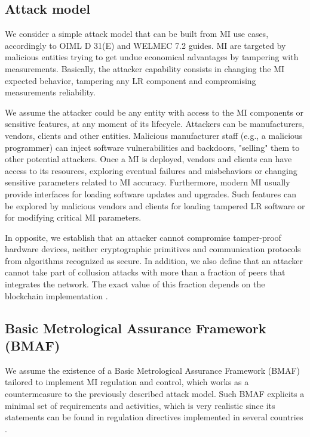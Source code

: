 \documentclass[journal]{IEEEtran}
\begin{document}
\subsection{Attack model}
\label{s:attackmodel}
We consider a simple attack model that can be built from MI use cases, accordingly to OIML D 31(E) and WELMEC 7.2 guides. MI are targeted by malicious entities trying to get undue economical advantages by tampering with measurements. 
Basically, the attacker capability consists in changing the MI expected behavior, tampering any LR component and compromising measurements reliability. 

We assume the attacker could be any entity with access to the MI components or sensitive features, at any moment of its lifecycle. 
Attackers can be manufacturers, vendors, clients and other entities. 
Malicious manufacturer staff (e.g., a malicious programmer) can inject software vulnerabilities and backdoors, "selling" them to other potential attackers. 
Once a MI is deployed, vendors and clients can have access to its resources, exploring eventual failures and misbehaviors or changing sensitive parameters related to MI accuracy. 
Furthermore, modern MI usually provide interfaces for loading software updates and upgrades. %
Such features can be explored by malicious vendors and clients for loading tampered LR software or for modifying critical MI parameters.

In opposite, we establish that an attacker cannot compromise tamper-proof hardware devices, neither cryptographic primitives and communication protocols from algorithms recognized as secure. In addition, we also define that an attacker cannot take part of collusion attacks with more than a fraction of peers that integrates the network. The exact value of this fraction depends on the blockchain implementation \cite{Vukolic2016}. %

\subsection{Basic Metrological Assurance Framework (BMAF)}
We assume the existence of a Basic Metrological Assurance Framework (BMAF) tailored to implement MI regulation and control, which works as a countermeasure to the  previously described attack model. Such BMAF explicits a minimal set of requirements and activities, which is very realistic since its statements can be found in regulation directives implemented in several countries \cite{Esche2015,Camara2012,Boccardo2014,Luchsinger2008}.
\end{document}
